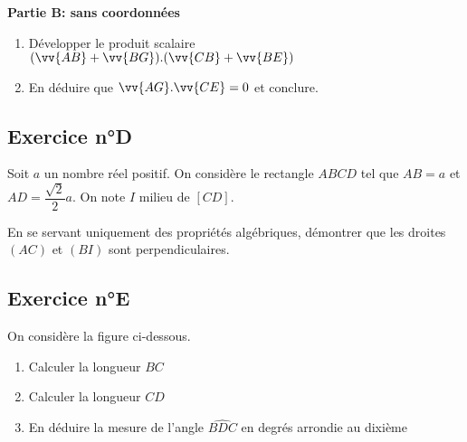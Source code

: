 \documentclass[12pt,a4paper]{article}
\begin{document}
\textbf{Partie B: sans coordonnées}

\begin{enumerate}
    \item Développer le produit scalaire $(\vv{AB}+\vv{BG}).(\vv{CB}+\vv{BE})$
    \item En déduire que $\vv{AG}.\vv{CE}=0$ et conclure.
\end{enumerate}

\newpage
\subsection*{Exercice n°D} 

Soit $a$ un nombre réel positif. On considère le rectangle $ABCD$ tel que $AB=a$ et $AD=\dfrac{\sqrt{2}}{2}a$.
On note $I$ milieu de $[CD]$.


\begin{center}
  
\end{center}

En se servant uniquement des propriétés algébriques, démontrer que les droites $(AC)$ et $(BI)$ sont perpendiculaires.

\subsection*{Exercice n°E} 

On considère la figure ci-dessous.

\begin{enumerate}
    \item Calculer la longueur $BC$
    \item Calculer la longueur $CD$
    \item En déduire la mesure de l'angle $\widehat{BDC}$ en degrés arrondie au dixième 
\end{enumerate}


\begin{center}
  
\end{center}
\end{document}
